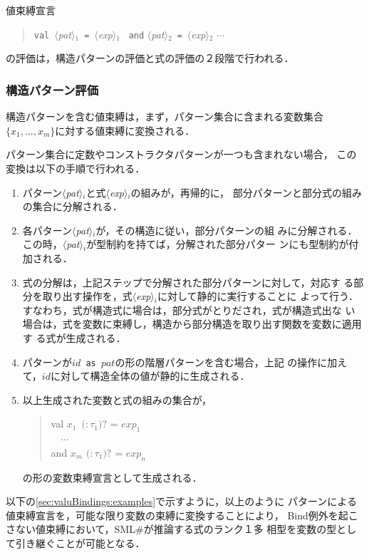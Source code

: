 \documentclass{jbook}
\newif\ifjp
\newcommand{\txt}[2]{#2}
\newcommand{\smlsharp}{SML\#}
\newcommand{\nonterm}[1]{\mbox{$\langle$}{\it #1}\mbox{$\rangle$}}
\newcommand{\term}[1]{\mbox{{\tt #1}}}
\newcommand{\optional}[1]{\mbox{$($}{\protect #1}\mbox{$)?$}}
\newcommand{\myem}{\mbox{\ \ }}
\newenvironment{program}{\begin{quote}\begin{tt}}%
                        {\end{tt}\end{quote}}
\begin{document}
\section{\txt{値束縛宣言の評価}{}}
\ifjp%

	値束縛宣言

\begin{program}
\term{val}\ \nonterm{pat}$_1$\ \term{=}\ \nonterm{exp}$_1$ \ \term{and} \nonterm{pat}$_2$\ \term{=}\ \nonterm{exp}$_2$ $\cdots$
\end{program}

の評価は，構造パターンの評価と式の評価の２段階で行われる．

\subsubsection{構造パターン評価}

	構造パターンを含む値束縛は，まず，パターン集合に含まれる変数集合
$\{x_1,\ldots,x_m\}$に対する値束縛に変換される．
	
	パターン集合に定数やコンストラクタパターンが一つも含まれない場合，
この変換は以下の手順で行われる．
\begin{enumerate}
\item 
	パターン\nonterm{pat}$_i$と式\nonterm{exp}$_i$の組みが，再帰的に，
部分パターンと部分式の組みの集合に分解される．

\item 
	各パターン\nonterm{pat}$_i$が，その構造に従い，部分パターンの組
みに分解される．
	この時，\nonterm{pat}$_i$が型制約を持てば，分解された部分パター
ンにも型制約が付加される．

\item 
	式の分解は，上記ステップで分解された部分パターンに対して，対応す
る部分を取り出す操作を，式\nonterm{exp}$_i$に対して静的に実行することに
よって行う．
	すなわち，式が構造式に場合は，部分式がとりだされ，式が構造式出な
い場合は，式を変数に束縛し，構造から部分構造を取り出す関数を変数に適用す
る式が生成される．

\item 
	パターンが{\tt $id$ as $pat$}の形の階層パターンを含む場合，上記
の操作に加えて，$id$に対して構造全体の値が静的に生成される．

\item 以上生成された変数と式の組みの集合が，
\begin{program}
  val $x_1$\ \optional{$:\tau_1$} = $exp_1$\\
  \myem $\cdots$\\
  and $x_m$ \optional{$:\tau_1$} = $exp_n$
\end{program}
の形の変数束縛宣言として生成される．
\end{enumerate}
	以下の\ref{sec:valuBindings:examples}で示すように，以上のように
パターンによる値束縛宣言を，可能な限り変数の束縛に変換することにより，
Bind例外を起こさない値束縛において，\smlsharp{}が推論する式のランク１多
相型を変数の型として引き継ぐことが可能となる．
\end{document}
